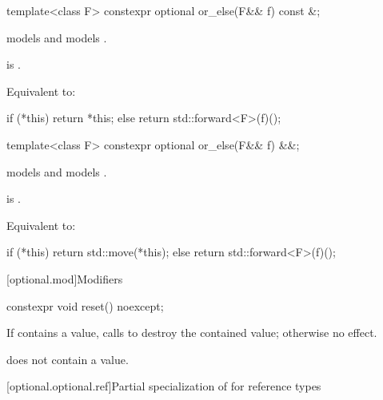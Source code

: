 \begin{itemdecl}
template<class F> constexpr optional or_else(F&& f) const &;
\end{itemdecl}

\begin{itemdescr}
\pnum
\constraints
{} models  and
 models .

\pnum
\mandates
{} is .

\pnum
\effects
Equivalent to:
\begin{codeblock}
if (*this) {
  return *this;
} else {
  return std::forward<F>(f)();
}
\end{codeblock}
\end{itemdescr}

\begin{itemdecl}
template<class F> constexpr optional or_else(F&& f) &&;
\end{itemdecl}

\begin{itemdescr}
\pnum
\constraints
{} models  and
 models .

\pnum
\mandates
{} is .

\pnum
\effects
Equivalent to:
\begin{codeblock}
if (*this) {
  return std::move(*this);
} else {
  return std::forward<F>(f)();
}
\end{codeblock}
\end{itemdescr}

[optional.mod]{Modifiers}

%
\begin{itemdecl}
constexpr void reset() noexcept;
\end{itemdecl}

\begin{itemdescr}
\pnum
\effects
If  contains a value, calls  to destroy the contained value;
otherwise no effect.

\pnum
\ensures
{} does not contain a value.
\end{itemdescr}

[optional.optional.ref]{Partial specialization of  for reference types}

